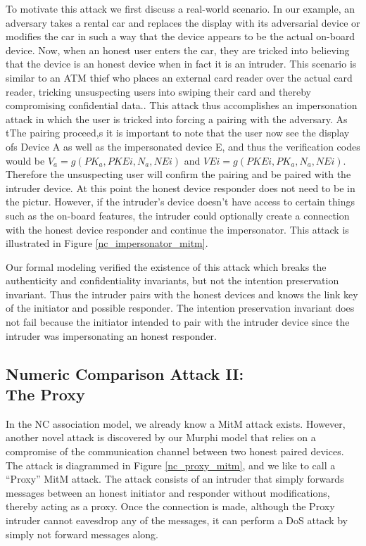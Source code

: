 \documentclass{acm_proc_article-sp}
\begin{document}
To motivate this attack we first discuss a real-world scenario. In our example, an adversary takes a rental car and replaces the display with its adversarial device or modifies the car in such a way that the device appears to be the actual on-board device. Now, when an honest user enters the car, they are tricked into believing that the device is an honest device when in fact it is an intruder. This scenario is similar to an ATM thief who places an external card reader over the actual card reader, tricking unsuspecting users into swiping their card and thereby compromising confidential data.. This attack thus accomplishes an impersonation attack in which the user is tricked into forcing a pairing with the adversary. As tThe pairing proceed,s it is important to note that the user now see the display ofs Device A as well as the impersonated device E, and thus the verification codes would be $V_a = g(PK_a, PKEi, N_a, NEi)$ and $VEi = g(PKEi, PK_a, N_a, NEi)$. Therefore the unsuspecting  user will confirm the pairing and be paired with the intruder device. At this point the honest device responder does not need to be in the pictur. However, if the intruder's device doesn't have access to certain things such as the on-board features, the intruder could optionally  create a connection with the honest device responder and continue the  impersonator. This attack is illustrated in Figure \ref{nc_impersonator_mitm}.

Our formal modeling verified the existence of this attack which breaks the authenticity and confidentiality invariants, but not the intention preservation invariant. Thus the intruder pairs with the honest devices and knows the link key of the initiator and possible responder. The intention preservation invariant does not fail because the initiator intended to pair with the intruder device since the intruder was impersonating an honest responder.

\subsection{Numeric Comparison Attack II:\\The Proxy}
In the NC association model, we already know a MitM attack exists. However, another novel attack is discovered by our Murphi model that relies on a compromise of the communication channel between two honest paired devices. The attack is diagrammed in Figure \ref{nc_proxy_mitm}, and we like to call a ``Proxy'' MitM attack. The attack consists of an intruder that simply forwards messages between an honest initiator and responder without modifications, thereby acting as a proxy. Once the connection is made, although the Proxy intruder cannot eavesdrop any of the messages, it can perform a DoS attack by simply not forward messages along.
\end{document}
